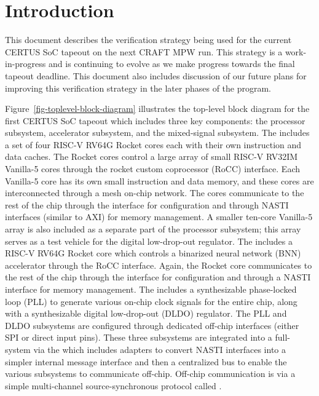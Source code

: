 
\section{Introduction}

This document describes the verification strategy being used for the
current CERTUS SoC tapeout on the next CRAFT MPW run. This strategy is a
work-in-progress and is continuing to evolve as we make progress towards
the final tapeout deadline. This document also includes discussion of our
future plans for improving this verification strategy in the later phases
of the program.



Figure~\ref{fig-toplevel-block-diagram} illustrates the top-level block
diagram for the first CERTUS SoC tapeout which includes three key
components: the processor subsystem, accelerator subsystem, and the
mixed-signal subsystem. The  includes a set of
four RISC-V RV64G Rocket cores each with their own instruction and data
caches. The Rocket cores control a large array of small RISC-V RV32IM
Vanilla-5 cores through the rocket custom coprocessor (RoCC) interface.
Each Vanilla-5 core has its own small instruction and data memory, and
these cores are interconnected through a mesh on-chip network. The cores
communicate to the rest of the chip through the  interface
for configuration and through NASTI interfaces (similar to AXI) for
memory management. A smaller ten-core Vanilla-5 array is also included as
a separate part of the processor subsystem; this array serves as a test
vehicle for the digital low-drop-out regulator. The  includes a RISC-V RV64G Rocket core which controls a
binarized neural network (BNN) accelerator through the RoCC interface.
Again, the Rocket core communicates to the rest of the chip through the
 interface for configuration and through a NASTI interface
for memory management. The  includes a
synthesizable phase-locked loop (PLL) to generate various on-chip clock
signals for the entire chip, along with a synthesizable digital
low-drop-out (DLDO) regulator. The PLL and DLDO subsystems are configured
through dedicated off-chip interfaces (either SPI or direct input pins).
These three subsystems are integrated into a full-system via the
 which includes adapters to convert NASTI interfaces
into a simpler internal message interface and then a centralized bus to
enable the various subsystems to communicate off-chip. Off-chip
communication is via a simple multi-channel source-synchronous protocol
called .

